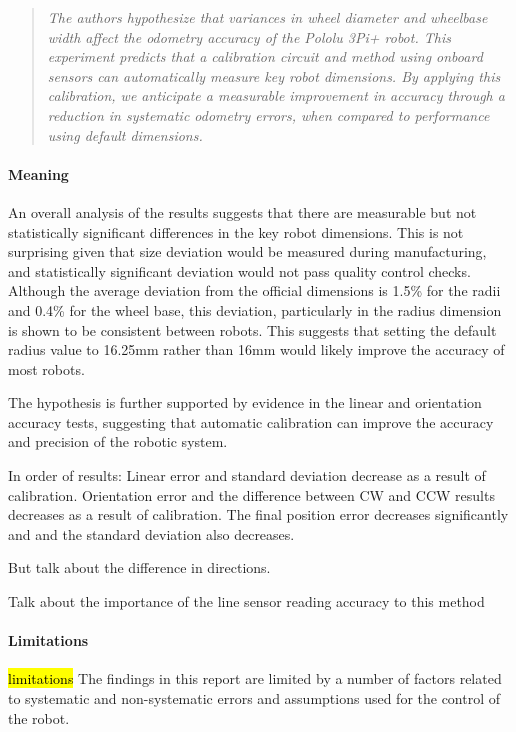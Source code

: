 \documentclass[conference]{IEEEtran}
\begin{document}
\begin{quote}
    \emph{
    The authors hypothesize that variances in wheel diameter and wheelbase width affect the odometry accuracy of the Pololu 3Pi+ robot.
    This experiment predicts that a calibration circuit and method using onboard sensors can automatically measure key robot dimensions.
    By applying this calibration, we anticipate a measurable improvement in accuracy through a reduction in systematic odometry errors, when compared to performance using default dimensions.
    }
\end{quote}

\paragraph{Meaning}
An overall analysis of the results suggests that there are measurable but not statistically significant differences in the key robot dimensions. 
This is not surprising given that size deviation would be measured during manufacturing, and statistically significant deviation would not pass quality control checks. 
Although the average deviation from the official dimensions is 1.5\% for the radii and 0.4\% for the wheel base, this deviation, particularly in the radius dimension is shown to be consistent between robots.
This suggests that setting the default radius value to 16.25mm rather than 16mm would likely improve the accuracy of most robots.

The hypothesis is further supported by evidence in the linear and orientation accuracy tests, suggesting that automatic calibration can improve the accuracy and precision of the robotic system. 

In order of results:
Linear error and standard deviation decrease as a result of calibration.
Orientation error and the difference between CW and CCW results decreases as a result of calibration.
The final position error decreases significantly and and the standard deviation also decreases.



But talk about the difference in directions.

Talk about the importance of the line sensor reading accuracy to this method




\paragraph{Limitations}

\hl{limitations}
The findings in this report are limited by a number of factors related to systematic and non-systematic errors and assumptions used for the control of the robot.
\end{document}
